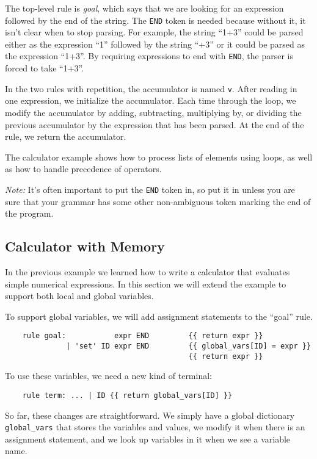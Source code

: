 \documentclass[10pt]{article}
\newcommand{\mysubsection}[1]{\subsection{\textcolor{darkerblue}{#1}}}
\begin{document}
The top-level rule is \emph{goal}, which says that we are looking for
an expression followed by the end of the string.  The \texttt{END}
token is needed because without it, it isn't clear when to stop
parsing.  For example, the string ``1+3'' could be parsed either as
the expression ``1'' followed by the string ``+3'' or it could be
parsed as the expression ``1+3''.  By requiring expressions to end
with \texttt{END}, the parser is forced to take ``1+3''.

In the two rules with repetition, the accumulator is named \texttt{v}.
After reading in one expression, we initialize the accumulator.  Each
time through the loop, we modify the accumulator by adding,
subtracting, multiplying by, or dividing the previous accumulator by
the expression that has been parsed.  At the end of the rule, we
return the accumulator.

The calculator example shows how to process lists of elements using
loops, as well as how to handle precedence of operators.

\emph{Note:} It's often important to put the \texttt{END} token in, so 
put it in unless you are sure that your grammar has some other
non-ambiguous token marking the end of the program.

\mysubsection{Calculator with Memory}

In the previous example we learned how to write a calculator that
evaluates simple numerical expressions.  In this section we will
extend the example to support both local and global variables.

To support global variables, we will add assignment statements to the
``goal'' rule.

\begin{verbatim}
    rule goal:           expr END         {{ return expr }}
              | 'set' ID expr END         {{ global_vars[ID] = expr }}
                                          {{ return expr }}   
\end{verbatim}

To use these variables, we need a new kind of terminal:

\begin{verbatim}
    rule term: ... | ID {{ return global_vars[ID] }} 
\end{verbatim}

So far, these changes are straightforward.  We simply have a global
dictionary \texttt{global\_vars} that stores the variables and values, 
we modify it when there is an assignment statement, and we look up
variables in it when we see a variable name.
\end{document}
